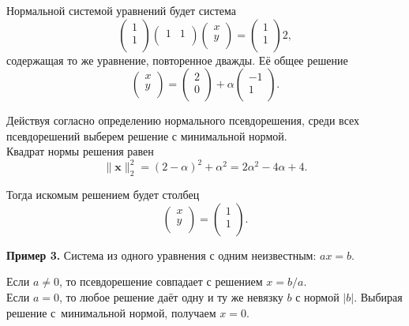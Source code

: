 \documentclass[11pt,a4paper]{article}
\begin{document}
Нормальной системой уравнений будет система \[
  \begin{pmatrix}
    1 \\
    1 \\
  \end{pmatrix}
  \begin{pmatrix}
    1 & 1 \\
  \end{pmatrix}
  \begin{pmatrix}
    x \\
    y \\
  \end{pmatrix}
  =
  \begin{pmatrix}
    1 \\
    1 \\
  \end{pmatrix}
  2,
\] содержащая то же уравнение, повторенное дважды. Её общее решение \[
  \begin{pmatrix}
    x \\
    y \\
  \end{pmatrix}
  =
  \begin{pmatrix}
    2 \\
    0 \\
  \end{pmatrix}
  + \alpha
  \begin{pmatrix}
    -1 \\
    1 \\
  \end{pmatrix}.
\]

Действуя согласно определению нормального псевдорешения, среди всех
псевдорешений выберем решение с минимальной нормой.\\
Квадрат нормы решения равен \[
  \|\mathbf{x}\|_2^2 = (2-\alpha)^2 + \alpha^2 = 2\alpha^2 - 4\alpha + 4.
\]

Тогда искомым решением будет столбец \[
  \begin{pmatrix}
    x \\
    y \\
  \end{pmatrix}
  =
  \begin{pmatrix}
    1 \\
    1 \\
  \end{pmatrix}.
\]

    \textbf{Пример 3.} Система из одного уравнения с одним неизвестным:
\(ax = b\).

Если \(a \ne 0\), то псевдорешение совпадает с решением \(x = b/a\).\\
Если \(a = 0\), то любое решение даёт одну и ту же невязку \(b\) с
нормой \(|b|\). Выбирая решение с~минимальной нормой, получаем
\(x = 0\).
\end{document}
